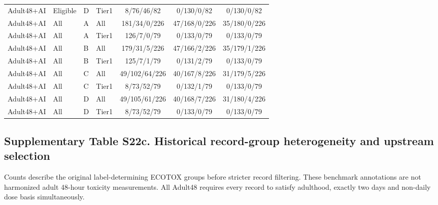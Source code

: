 \begin{longtable}{llllccc}
Adult48+AI & Eligible & D & Tier1 & 8/76/46/82 & 0/130/0/82 & 0/130/0/82 \\

Adult48+AI & All & A & All & 181/34/0/226 & 47/168/0/226 & 35/180/0/226 \\

Adult48+AI & All & A & Tier1 & 126/7/0/79 & 0/133/0/79 & 0/133/0/79 \\

Adult48+AI & All & B & All & 179/31/5/226 & 47/166/2/226 & 35/179/1/226 \\

Adult48+AI & All & B & Tier1 & 125/7/1/79 & 0/131/2/79 & 0/133/0/79 \\

Adult48+AI & All & C & All & 49/102/64/226 & 40/167/8/226 & 31/179/5/226 \\

Adult48+AI & All & C & Tier1 & 8/73/52/79 & 0/132/1/79 & 0/133/0/79 \\

Adult48+AI & All & D & All & 49/105/61/226 & 40/168/7/226 & 31/180/4/226 \\

Adult48+AI & All & D & Tier1 & 8/73/52/79 & 0/133/0/79 & 0/133/0/79 \\

\end{longtable}\endgroup

\subsection*{Supplementary Table S22c. Historical record-group heterogeneity and upstream selection}

Counts describe the original label-determining ECOTOX groups before stricter record filtering. These benchmark annotations are not harmonized adult 48-hour toxicity measurements. All Adult48 requires every record to satisfy adulthood, exactly two days and non-daily dose basis simultaneously.

\begingroup\small\setlength{\tabcolsep}{4pt}


